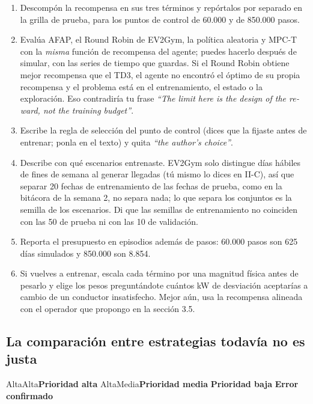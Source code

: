 \documentclass[11pt]{article}
\newcommand{\prioridad}[1]{%
  \def\tmpA{Alta}\def\tmpM{Media}\def\tmp{#1}%
  \ifx\tmp\tmpA\colorbox{rojoerror}{\color{white}\small\bfseries Prioridad alta}%
  \else\ifx\tmp\tmpM\colorbox{naranjatarea}{\color{white}\small\bfseries Prioridad media}%
  \else\colorbox{azulidea}{\color{white}\small\bfseries Prioridad baja}\fi\fi}
\newcommand{\confirmado}{\colorbox{rojoerror!15}{\small\bfseries\color{rojoerror} Error confirmado}}
\begin{document}
\begin{tarea}
\begin{enumerate}
\item Descompón la recompensa en sus tres términos y repórtalos por separado en la grilla de prueba, para los puntos de control de 60.000 y de 850.000 pasos.
\item Evalúa AFAP, el Round Robin de EV2Gym, la política aleatoria y MPC-T con la \emph{misma} función de recompensa del agente; puedes hacerlo después de simular, con las series de tiempo que guardas. Si el Round Robin obtiene mejor recompensa que el TD3, el agente no encontró el óptimo de su propia recompensa y el problema está en el entrenamiento, el estado o la exploración. Eso contradiría tu frase \foreignlanguage{english}{\emph{``The limit here is the design of the reward, not the training budget''}}.
\item Escribe la regla de selección del punto de control (dices que la fijaste antes de entrenar; ponla en el texto) y quita \foreignlanguage{english}{\emph{``the author's choice''}}.
\item Describe con qué escenarios entrenaste. EV2Gym solo distingue días hábiles de fines de semana al generar llegadas (tú mismo lo dices en II-C), así que separar 20 fechas de entrenamiento de las fechas de prueba, como en la bitácora de la semana 2, no separa nada; lo que separa los conjuntos es la semilla de los escenarios. Di que las semillas de entrenamiento no coinciden con las 50 de prueba ni con las 10 de validación.
\item Reporta el presupuesto en episodios además de pasos: 60.000 pasos son 625 días simulados y 850.000 son 8.854.
\item Si vuelves a entrenar, escala cada término por una magnitud física antes de pesarlo y elige los pesos preguntándote cuántos kW de desviación aceptarías a cambio de un conductor insatisfecho. Mejor aún, usa la recompensa alineada con el operador que propongo en la sección 3.5.
\end{enumerate}
\end{tarea}

\subsection{La comparación entre estrategias todavía no es justa}
\prioridad{Alta} \confirmado
\end{document}
